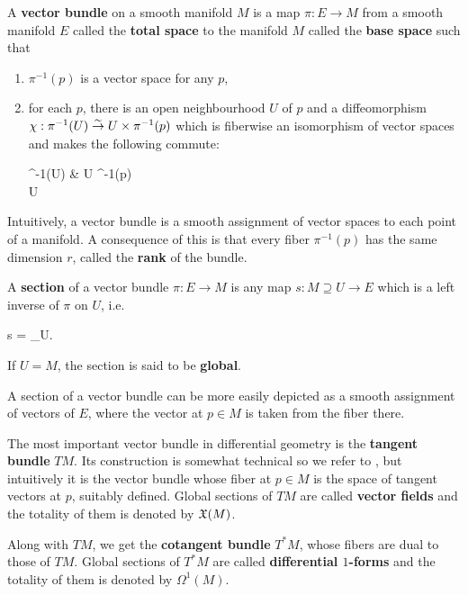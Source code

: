 \begin{definition}
	A \textbf{vector bundle} on a smooth manifold $M$ is a map $\pi : E \to M$ from a smooth manifold $E$ called the \textbf{total space} to the manifold $M$ called the \textbf{base space} such that
	\begin{enumerate}
		\item $\pi^{-1}(p)$ is a vector space for any $p$,
		\item for each $p$, there is an open neighbourhood $U$ of $p$ and a diffeomorphism $\chi :\pi^{-1}(U) \overset{\sim}\to U \times \pi^{-1}(p)$ which is fiberwise an isomorphism of vector spaces and makes the following commute:
		\begin{diagram}
			\pi^{-1}(U)   \& U \times \pi^{-1}(p) \\
			U
		\end{diagram}
	\end{enumerate}
\end{definition}

Intuitively, a vector bundle is a smooth assignment of vector spaces to each point of a manifold. A consequence of this is that every fiber $\pi^{-1}(p)$ has the same dimension $r$, called the \textbf{rank} of the bundle.

\begin{definition}
	A \textbf{section} of a vector bundle $\pi : E \to M$ is any map $s : M \supseteq U \to E$ which is a left inverse of $\pi$ on $U$, i.e. \begin{eqalign}
		\pi \circ s = \id_U.
	\end{eqalign}
	If $U=M$, the section is said to be \textbf{global}.
\end{definition}

A section of a vector bundle can be more easily depicted as a smooth assignment of vectors of $E$, where the vector at $p \in M$ is taken from the fiber there.

The most important vector bundle in differential geometry is the \textbf{tangent bundle} $TM$. Its construction is somewhat technical so we refer to \cite{abate2011geometria}, but intuitively it is the vector bundle whose fiber at $p \in M$ is the space of tangent vectors at $p$, suitably defined. Global sections of $TM$ are called \textbf{vector fields} and the totality of them is denoted by $\mathfrak{X}(M)$.

Along with $TM$, we get the \textbf{cotangent bundle} $T^*M$, whose fibers are dual to those of $TM$. Global sections of $T^*M$ are called \textbf{differential $1$-forms} and the totality of them is denoted by $\Omega^1(M)$.

